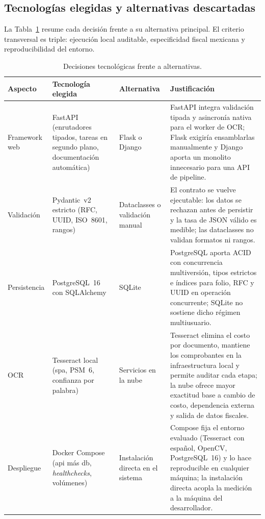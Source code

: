 \subsection{Tecnologías elegidas y alternativas descartadas} \label{sec:prop_tecnologias}

La Tabla~\ref{tab:decision_tecnologica} resume cada decisión frente a su alternativa principal. El criterio transversal es triple: ejecución local auditable, especificidad fiscal mexicana y reproducibilidad del entorno.

\begin{table}[H]
\centering
\small
\caption{Decisiones tecnológicas frente a alternativas.}
\label{tab:decision_tecnologica}
\begin{tabular}{@{}p{2.6cm}p{3.6cm}p{3.6cm}p{3.6cm}@{}}
\toprule
\textbf{Aspecto} & \textbf{Tecnología elegida} & \textbf{Alternativa} & \textbf{Justificación} \\
\midrule
Framework web & FastAPI (enrutadores tipados, tareas en segundo plano, documentación automática) & Flask o Django & FastAPI integra validación tipada y asincronía nativa para el worker de OCR; Flask exigiría ensamblarlas manualmente y Django aporta un monolito innecesario para una API de pipeline\cite{fastapi_docs}. \\
Validación & Pydantic~v2 estricto (RFC, UUID, ISO~8601, rangos) & Dataclasses o validación manual & El contrato se vuelve ejecutable: los datos se rechazan antes de persistir y la tasa de JSON válido es medible; las dataclasses no validan formatos ni rangos\cite{pydantic_v2_2024}. \\
Persistencia & PostgreSQL~16 con SQLAlchemy & SQLite & PostgreSQL aporta ACID con concurrencia multiversión, tipos estrictos e índices para folio, RFC y UUID en operación concurrente; SQLite no sostiene dicho régimen multiusuario\cite{postgres_docs_2024, sqlalchemy_docs_2024}. \\
OCR & Tesseract local (spa, PSM~6, confianza por palabra) & Servicios en la nube & Tesseract elimina el costo por documento, mantiene los comprobantes en la infraestructura local y permite auditar cada etapa; la nube ofrece mayor exactitud base a cambio de costo, dependencia externa y salida de datos fiscales\cite{tesseract_ocr, gcp_document_ai}. \\
Despliegue & Docker Compose (api más db, \textit{healthchecks}, volúmenes) & Instalación directa en el sistema & Compose fija el entorno evaluado (Tesseract con español, OpenCV, PostgreSQL~16) y lo hace reproducible en cualquier máquina; la instalación directa acopla la medición a la máquina del desarrollador\cite{docker_docs}. \\
\bottomrule
\end{tabular}
\end{table}

